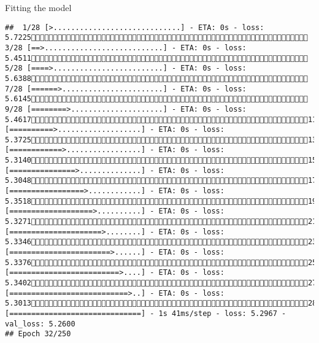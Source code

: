 \documentclass[
  ignorenonframetext,
]{beamer}
\begin{document}
\begin{frame}[fragile]{Fitting the model}
\begin{verbatim}
##  1/28 [>.............................] - ETA: 0s - loss: 5.7225 3/28 [==>...........................] - ETA: 0s - loss: 5.4511 5/28 [====>.........................] - ETA: 0s - loss: 5.6388 7/28 [======>.......................] - ETA: 0s - loss: 5.6145 9/28 [========>.....................] - ETA: 0s - loss: 5.461711/28 [==========>...................] - ETA: 0s - loss: 5.372513/28 [============>.................] - ETA: 0s - loss: 5.314015/28 [===============>..............] - ETA: 0s - loss: 5.304817/28 [=================>............] - ETA: 0s - loss: 5.351819/28 [===================>..........] - ETA: 0s - loss: 5.327121/28 [=====================>........] - ETA: 0s - loss: 5.334623/28 [=======================>......] - ETA: 0s - loss: 5.337625/28 [=========================>....] - ETA: 0s - loss: 5.340227/28 [===========================>..] - ETA: 0s - loss: 5.301328/28 [==============================] - 1s 41ms/step - loss: 5.2967 - val_loss: 5.2600
## Epoch 32/250

\end{verbatim}
\end{frame}
\end{document}
